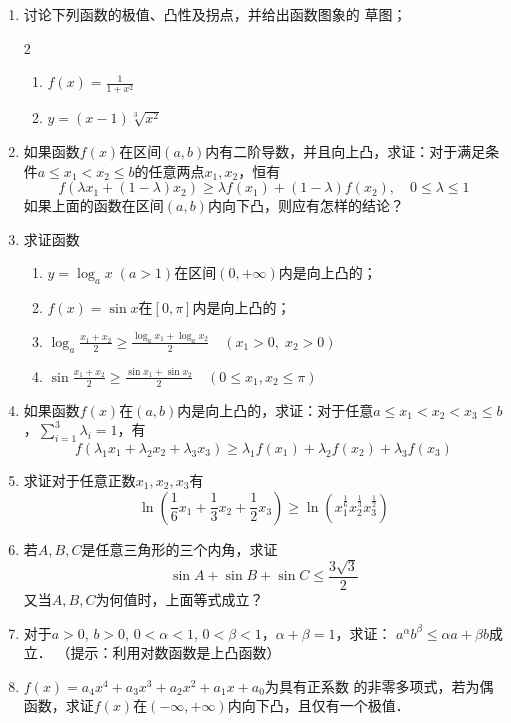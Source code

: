\begin{ex}
\begin{enumerate}
    \item 讨论下列函数的极值、凸性及拐点，并给出函数图象的
    草图；
\begin{multicols}{2}
\begin{enumerate}
    \item $f(x)=\frac{1}{1+x^2}$
    \item $y=(x-1)\sqrt[3]{x^2}$
\end{enumerate}
\end{multicols}
\item 如果函数$f(x)$在区间$(a,b)$内有二阶导数，并且向上凸，求证：对于满足条件$a\le x_1<x_2\le b$的任意两点$x_1,x_2$，恒有
\[f (\lambda x_1+ (1-\lambda) x_2) \ge \lambda f (x_1) + (1-\lambda)f (x_2) ,\quad  0\le\lambda\le 1\]
如果上面的函数在区间$(a,b)$内向下凸，则应有怎样的结论？
\item 求证函数
\begin{enumerate}
    \item $y=\log_ax \; (a>1)$在区间$(0,+\infty)$内是向上凸的；
    \item $f(x)=\sin x$在$[0,\pi]$内是向上凸的；
    \item $\log_a\frac{x_1+x_2}{2}\ge \frac{\log_a x_1+\log_a x_2}{2}\quad (x_1> 0,\; x_2>0)$
    \item $\sin\frac{x_1+x_2}{2}\ge \frac{\sin x_1+\sin x_2}{2}\quad  (0\le x_1,x_2\le \pi)$
\end{enumerate}

\item 如果函数$f(x)$在$(a,b)$内是向上凸的，求证：对于任意$a\le x_1<x_2<x_3\le b$，$\sum^3_{i=1}\lambda_i=1$，有
\[f(\lambda_1x_1+\lambda_2x_2+\lambda_3x_3)\ge \lambda_1f(x_1)+\lambda_2f(x_2)+\lambda_3f(x_3)\]

\item  求证对于任意正数$x_1,x_2,x_3$有
\[\ln\left(\frac{1}{6}x_1+\frac{1}{3}x_2+\frac{1}{2}x_3\right) \ge \ln \left(x_1^{\tfrac{1}{6}}x_2^{\tfrac{1}{3}}x_3^{\tfrac{1}{2}} \right)\]
\item  若$A,B,C$是任意三角形的三个内角，求证
\[\sin A+\sin B+\sin C\le \frac{3\sqrt{3}}{2}\]
又当$A,B,C$为何值时，上面等式成立？
\item  对于$a>0$, $b>0$, $0<\alpha<1$, $0<\beta<1$，$\alpha+\beta=1$，求证：
$a^{\alpha}b^{\beta}\le \alpha a+\beta b$成立．
（提示：利用对数函数是上凸函数）
\item  $f(x)=a_4x^4+a_3x^3+a_2x^2+a_1x+a_0$为具有正系数
的非零多项式，若为偶函数，求证$f(x)$在$(-\infty,+\infty)$内向下凸，且仅有一个极值．
\end{enumerate}
\end{ex}

